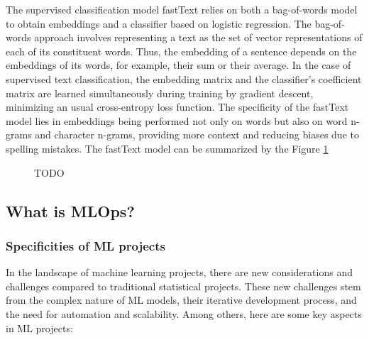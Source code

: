 The supervised classification model fastText relies on both a bag-of-words model to obtain embeddings and a classifier based on logistic regression. The bag-of-words approach involves representing a text as the set of vector representations of each of its constituent words. Thus, the embedding of a sentence depends on the embeddings of its words, for example, their sum or their average. In the case of supervised text classification, the embedding matrix and the classifier's coefficient matrix are learned simultaneously during training by gradient descent, minimizing an usual cross-entropy loss function. The specificity of the fastText model lies in embeddings being performed not only on words but also on word n-grams and character n-grams, providing more context and reducing biases due to spelling mistakes. The fastText model can be summarized by the Figure \ref{fig:fasttext}

\begin{figure}[htbp]
    \centering
    \caption{TODO}
    \label{fig:fasttext}
\end{figure}

\subsection{What is MLOps?}


\subsubsection{Specificities of ML projects}

In the landscape of machine learning projects, there are new considerations and challenges compared to traditional statistical projects. These new challenges stem from the complex nature of ML models, their iterative development process, and the need for automation and scalability. Among others, here are some key aspects in ML projects:

